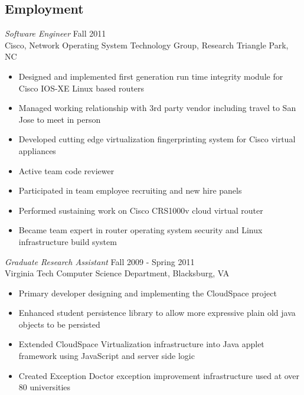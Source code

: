 \documentclass[line,margin]{res}
\begin{document}
\begin{resume}
\section{Employment}
        {\sl Software Engineer} \hfill Fall 2011 \\
           Cisco, Network Operating System Technology Group, Research Triangle Park, NC
              \begin{itemize}  \itemsep -2pt %
                 \item Designed and implemented first generation run time integrity
                  module for Cisco IOS-XE Linux based routers
                 \item Managed working relationship with 3rd party vendor including
                   travel to San Jose to meet in person
                 \item Developed cutting edge virtualization fingerprinting system for
                   Cisco virtual appliances
                 \item Active team code reviewer
                 \item Participated in team employee recruiting and new hire panels
                 \item Performed sustaining work on Cisco CRS1000v cloud virtual router
                 \item Became team expert in router operating system security and
                   Linux infrastructure build system
              \end{itemize}
        {\sl Graduate Research Assistant} \hfill  Fall 2009 - Spring 2011 \\
           Virginia Tech Computer Science Department, Blacksburg, VA
              \begin{itemize} \itemsep -2pt %
                   \item Primary developer designing and implementing the CloudSpace project
                   \item Enhanced student persistence library to allow more
                     expressive plain old java objects to be persisted
                   \item Extended CloudSpace Virtualization infrastructure
                     into Java applet framework using JavaScript and server side logic
                   \item Created Exception Doctor exception improvement infrastructure used at over 80 universities
              \end{itemize}

\end{resume}
\end{document}
